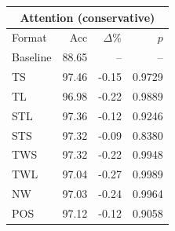 \begin{tabular}{lrrr}
\toprule
\multicolumn{4}{c}{\textbf{Attention (conservative)}} \\
\midrule
Format & Acc & $\Delta$\% & $p$ \\
\midrule
Baseline & 88.65 & -- & -- \\
\midrule
TS & 97.46 & -0.15 & 0.9729 \\
TL & 96.98 & -0.22 & 0.9889 \\
STL & 97.36 & -0.12 & 0.9246 \\
STS & 97.32 & -0.09 & 0.8380 \\
TWS & 97.32 & -0.22 & 0.9948 \\
TWL & 97.04 & -0.27 & 0.9989 \\
NW & 97.03 & -0.24 & 0.9964 \\
POS & 97.12 & -0.12 & 0.9058 \\
\bottomrule
\end{tabular}